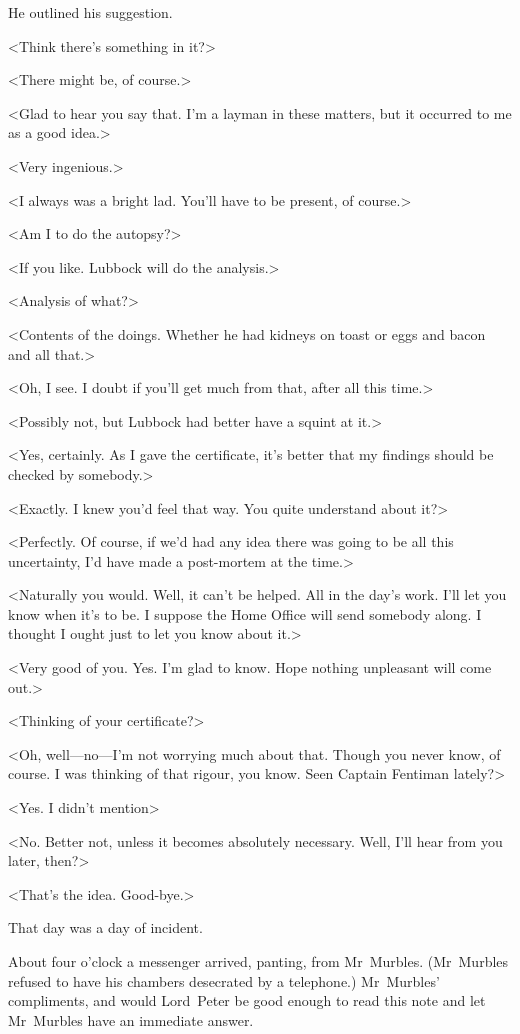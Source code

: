 He outlined his suggestion.

<Think there's something in it?>

<There might be, of course.>

<Glad to hear you say that. I'm a layman in these matters, but it occurred to me as a good idea.>

<Very ingenious.>

<I always was a bright lad. You'll have to be present, of course.>

<Am I to do the autopsy?>

<If you like. Lubbock will do the analysis.>

<Analysis of what?>

<Contents of the doings. Whether he had kidneys on toast or eggs and bacon and all that.>

<Oh, I see. I doubt if you'll get much from that, after all this time.>

<Possibly not, but Lubbock had better have a squint at it.>

<Yes, certainly. As I gave the certificate, it's better that my findings should be checked by somebody.>

<Exactly. I knew you'd feel that way. You quite understand about it?>

<Perfectly. Of course, if we'd had any idea there was going to be all this uncertainty, I'd have made a post-mortem at the time.>

<Naturally you would. Well, it can't be helped. All in the day's work. I'll let you know when it's to be. I suppose the Home Office will send somebody along. I thought I ought just to let you know about it.>

<Very good of you. Yes. I'm glad to know. Hope nothing unpleasant will come out.>

<Thinking of your certificate?>

<Oh, well—no—I'm not worrying much about that. Though you never know, of course. I was thinking of that rigour, you know. Seen Captain Fentiman lately?>

<Yes. I didn't mention\longdash>

<No. Better not, unless it becomes absolutely necessary. Well, I'll hear from you later, then?>

<That's the idea. Good-bye.>

That day was a day of incident.

About four o'clock a messenger arrived, panting, from Mr~Murbles. (Mr~Murbles refused to have his chambers desecrated by a telephone.) Mr~Murbles' compliments, and would Lord~Peter be good enough to read this note and let Mr~Murbles have an immediate answer.

